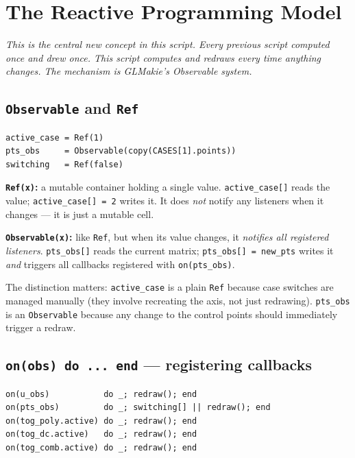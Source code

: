\documentclass[12pt, a4paper]{article}
\newcommand{\cd}[1]{\texttt{#1}}
\begin{document}
\section{The Reactive Programming Model}

\textit{This is the central new concept in this script.
Every previous script computed once and drew once.
This script computes and redraws every time anything changes.
The mechanism is GLMakie's Observable system.}

\subsection{\texttt{Observable} and \texttt{Ref}}

\begin{verbatim}
active_case = Ref(1)
pts_obs     = Observable(copy(CASES[1].points))
switching   = Ref(false)
\end{verbatim}

\textbf{\cd{Ref(x)}:} a mutable container holding a single
value.
\cd{active\_case[]} reads the value; \cd{active\_case[] = 2}
writes it.
It does \emph{not} notify any listeners when it changes ---
it is just a mutable cell.

\textbf{\cd{Observable(x)}:} like \cd{Ref}, but when its
value changes, it \emph{notifies all registered listeners}.
\cd{pts\_obs[]} reads the current matrix;
\cd{pts\_obs[] = new\_pts} writes it \emph{and}
triggers all callbacks registered with \cd{on(pts\_obs)}.

The distinction matters: \cd{active\_case} is a plain
\cd{Ref} because case switches are managed manually
(they involve recreating the axis, not just redrawing).
\cd{pts\_obs} is an \cd{Observable} because any change
to the control points should immediately trigger a redraw.

\subsection{\texttt{on(obs) do ... end} --- registering callbacks}

\begin{verbatim}
on(u_obs)           do _; redraw(); end
on(pts_obs)         do _; switching[] || redraw(); end
on(tog_poly.active) do _; redraw(); end
on(tog_dc.active)   do _; redraw(); end
on(tog_comb.active) do _; redraw(); end
\end{verbatim}
\end{document}
